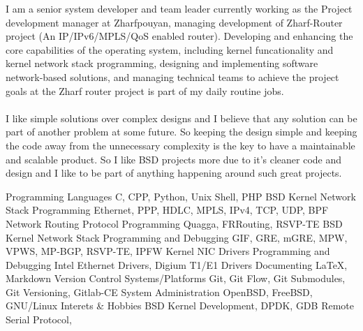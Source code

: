 \documentclass[12pt]{developercv}
\begin{document}
\begin{minipage}[t]{1\textwidth}
I am a senior system developer and team leader currently working
as the Project development manager at Zharfpouyan, managing development
of Zharf-Router project (An IP/IPv6/MPLS/QoS enabled router).
Developing and enhancing the core capabilities of the operating system,
including kernel funcationality and kernel network stack programming,
designing and implementing software network-based solutions, and managing
technical teams to achieve the project goals at the Zharf router project is
part of my daily routine jobs.
\\
\\
I like simple solutions over complex designs and I believe that any solution
can be part of another problem at some future. So keeping the design simple and
keeping the code away from the unnecessary complexity is the key to have a
maintainable and scalable product. So I like BSD projects more due to it's cleaner
code and design and I like to be part of anything happening around such great projects.

\end{minipage}
\hfill %
%

\begin{entrylist}
	\entry
		{}
		{Programming Languages}
		{}
		{C, CPP, Python, Unix Shell, PHP}
	\entry
		{}
		{BSD Kernel Network Stack Programming}
		{}
		{Ethernet, PPP, HDLC, MPLS, IPv4, TCP, UDP, BPF}
	\entry
		{}
		{Network Routing Protocol Programming}
		{}
		{Quagga, FRRouting, RSVP-TE}
	\entry
		{}
		{BSD Kernel Network Stack Programming and Debugging}
		{}
		{GIF, GRE, mGRE, MPW, VPWS, MP-BGP, RSVP-TE, IPFW}
	\entry
		{}
		{Kernel NIC Drivers Programming and Debugging}
		{}
		{Intel Ethernet Drivers, Digium T1/E1 Drivers} %
	\entry
		{}
		{Documenting}
		{}
		{\LaTeX, Markdown}
	\entry
		{}
		{Version Control Systems/Platforms}
		{}
		{Git, Git Flow, Git Submodules, Git Versioning, Gitlab-CE}
	\entry
		{}
		{System Administration}
		{}
		{OpenBSD, FreeBSD, GNU/Linux}
	\entry
		{}
		{Interets \& Hobbies}
		{}
		{BSD Kernel Development, DPDK, GDB Remote Serial Protocol, }
\end{entrylist}
\end{document}
